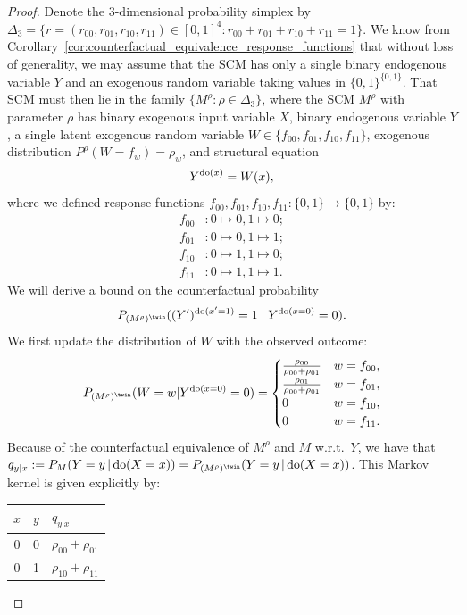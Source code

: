 \begin{proof}
  Denote the $3$-dimensional probability simplex by $\Delta_3=\{r=(r_{00},r_{01},r_{10},r_{11}) \in [0,1]^4 : r_{00}+r_{01}+r_{10}+r_{11}= 1\}$.
  We know from Corollary~\ref{cor:counterfactual_equivalence_response_functions} that without loss of generality, we may assume that the SCM has only a single binary endogenous variable $Y$ and an exogenous random variable taking values in $\{0,1\}^{\{0,1\}}$.
  That SCM must then lie in the family $\{M^\rho : \rho \in \Delta_3\}$, where the SCM $M^\rho$ with parameter $\rho$ has binary exogenous input variable $X$, binary endogenous variable $Y$, a single latent exogenous random variable $W \in \{f_{00},f_{01},f_{10},f_{11}\}$, exogenous distribution $P^\rho(W=f_w) = \rho_w$, and structural equation
  $$Y^{\operatorname{do}(x)} = W(x),$$
where we defined response functions $f_{00},f_{01},f_{10},f_{11} : \{0,1\} \to \{0,1\}$ by:
  \begin{align*}
    f_{00} &: 0 \mapsto 0, 1 \mapsto 0;\\
    f_{01} &: 0 \mapsto 0, 1 \mapsto 1;\\
    f_{10} &: 0 \mapsto 1, 1 \mapsto 0;\\
    f_{11} &: 0 \mapsto 1, 1 \mapsto 1.
  \end{align*}
We will derive a bound on the counterfactual probability
  $$P_{(M^{\rho})^{\twin}}((Y')^{\doit(x'=1)}=1\mid Y^{\doit(x=0)}=0).$$
We first update the distribution of $W$ with the observed outcome:
  $$P_{(M^{\rho})^{\twin}}(W=w | Y^{\doit(x=0)}=0) = 
    \begin{cases}
      \frac{\rho_{00}}{\rho_{00} + \rho_{01}} & w = f_{00}, \\
      \frac{\rho_{01}}{\rho_{00} + \rho_{01}} & w = f_{01}, \\
      0 & w = f_{10}, \\
      0 & w = f_{11}.
    \end{cases}$$
Because of the counterfactual equivalence of $M^\rho$ and $M$ w.r.t.\ $Y$, we have that
  $q_{y|x} := P_M(Y=y\given \doit(X=x)) = P_{(M^{\rho})^\twin}(Y=y\given \doit(X=x))$.
This Markov kernel is given explicitly by:
  \begin{center}\begin{tabular}{ccl}
    $x$ & $y$ & $q_{y|x}$ \\
    \hline
    0   & 0   & $\rho_{00} + \rho_{01}$ \\ %
    0   & 1   & $\rho_{10} + \rho_{11}$ \\ %

\end{tabular}
\end{center}
\end{proof}
